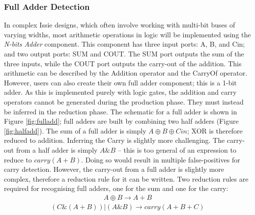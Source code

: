 \subsubsection{Full Adder Detection}
In complex Issie designs, which often involve working with multi-bit buses of varying widths, most arithmetic operations in logic will be implemented using the \textit{N-bits Adder} component. This component has three input ports: A, B, and Cin; and two output ports: SUM and COUT. The SUM port outputs the sum of the three inputs, while the COUT port outputs the carry-out of the addition. This arithmetic can be described by the Addition operator and the CarryOf operator. However, users can also create their own full adder component; this is a 1-bit adder. As this is implemented purely with logic gates, the addition and carry operators cannot be generated during the production phase. They must instead be inferred in the reduction phase. The schematic for a full adder is shown in Figure \ref{fig:fulladd}; full adders are built by combining two half adders (Figure \ref{fig:halfadd}). The sum of a full adder is simply $A \oplus B \oplus Cin$; XOR is therefore reduced to addition. Inferring the Carry is slightly more challenging. The carry-out from a half adder is simply $A \& B$ -- this is too general of an expression to reduce to $carry(A + B)$. Doing so would result in multiple false-positives for carry detection. However, the carry-out from a full adder is slightly more complex, therefore a reduction rule for it can be written. Two reduction rules are required for recognising full adders, one for the sum and one for the carry:
\begin{align}
    A \oplus B \rightarrow A + B
\end{align}
\begin{align}
    (C \& (A + B)) | (A \& B) \rightarrow carry(A + B + C)
\end{align}

